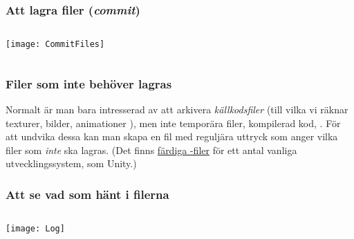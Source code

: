 \documentclass[swedish]{beamer}
\newenvironment{dialogue}{%
\VerbatimEnvironment
\begin{Verbatim}[fontsize=\footnotesize,commandchars=\#\(\)]%
}
{%
\end{Verbatim}
}
\begin{document}
\begin{frame}[fragile]
\frametitle{Att lagra filer (\emph{commit})}  
\begin{columns}
\begin{column}{0.5\textwidth}

\vspace{\baselineskip}

\texttt{[image: CommitFiles]}

\end{column}
\end{columns}
\end{frame}

\begin{frame}[fragile]
\frametitle{Filer som inte behöver lagras}  
Normalt är man bara intresserad av att arkivera \emph{källkodsfiler} (till vilka vi räknar texturer, bilder, animationer \odyl), men inte temporära filer, kompilerad kod, \osv.  För att undvika dessa kan man skapa en fil  med reguljära uttryck som anger vilka filer som \emph{inte} ska lagras.  (Det finns \href{https://github.com/github/gitignore}{färdiga -filer} för ett antal vanliga utvecklingssystem, som \tex Unity.)


\end{frame}

\begin{frame}[fragile]
\frametitle{Att se vad som hänt i filerna}  
\begin{columns}
\begin{column}{0.5\textwidth}

\vspace{\baselineskip}

\texttt{[image: Log]}
\end{column}
\end{columns}
\end{frame}
\end{document}

